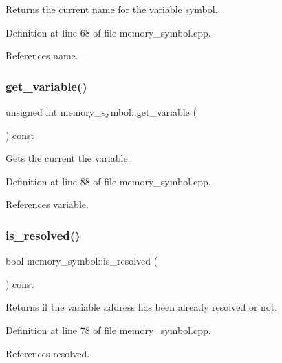 Returns the current name for the variable symbol. 



Definition at line 68 of file memory\+\_\+symbol.\+cpp.



References name.

\mbox{\label{classmemory__symbol_acd591fc85268b87620330ad55c7d9699}} 
\subsubsection{\texorpdfstring{get\+\_\+variable()}{get\_variable()}}
{\footnotesize\ttfamily unsigned int memory\+\_\+symbol\+::get\+\_\+variable (\begin{DoxyParamCaption}{ }\end{DoxyParamCaption}) const}



Gets the current the variable. 



Definition at line 88 of file memory\+\_\+symbol.\+cpp.



References variable.

\mbox{\label{classmemory__symbol_ad7fee9476d1609516c62f687d544320d}} 
\subsubsection{\texorpdfstring{is\+\_\+resolved()}{is\_resolved()}}
{\footnotesize\ttfamily bool memory\+\_\+symbol\+::is\+\_\+resolved (\begin{DoxyParamCaption}{ }\end{DoxyParamCaption}) const}



Returns if the variable address has been already resolved or not. 



Definition at line 78 of file memory\+\_\+symbol.\+cpp.



References resolved.

